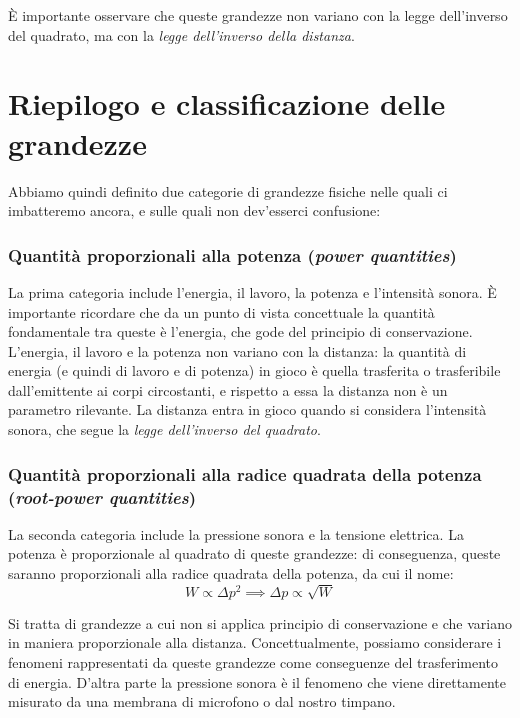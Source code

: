 \documentclass[11pt]{report}
\begin{document}
È importante osservare che queste grandezze non variano con la legge dell'inverso del quadrato, ma con la \emph{legge dell'inverso della distanza}.



\section{Riepilogo e classificazione delle grandezze}

Abbiamo quindi definito due categorie di grandezze fisiche nelle quali ci imbatteremo ancora, e sulle quali non dev'esserci confusione:

\subsubsection{Quantità proporzionali alla potenza (\emph{power quantities})}

La prima categoria include l'energia, il lavoro, la potenza e l'intensità sonora. È importante ricordare che da un punto di vista concettuale la quantità fondamentale tra queste è l'energia, che gode del principio di conservazione. L'energia, il lavoro e la potenza non variano con la distanza: la quantità di energia (e quindi di lavoro e di potenza) in gioco è quella trasferita o trasferibile dall'emittente ai corpi circostanti, e rispetto a essa la distanza non è un parametro rilevante. La distanza entra in gioco quando si considera l'intensità sonora, che segue la \emph{legge dell'inverso del quadrato}.


\subsubsection{Quantità proporzionali alla radice quadrata della potenza (\emph{root-power quantities})}

La seconda categoria include la pressione sonora e la tensione elettrica. La potenza è proporzionale al quadrato di queste grandezze: di conseguenza, queste saranno proporzionali alla radice quadrata della potenza, da cui il nome:
\begin{equation}
W \propto \Delta p^2 \implies \Delta p \propto \sqrt{W}
\end{equation}

Si tratta di grandezze a cui non si applica principio di conservazione e che variano in maniera proporzionale alla distanza. Concettualmente, possiamo considerare i fenomeni rappresentati da queste grandezze come conseguenze del trasferimento di energia. D'altra parte la pressione sonora è il fenomeno che viene direttamente misurato da una membrana di microfono o dal nostro timpano.
\end{document}
